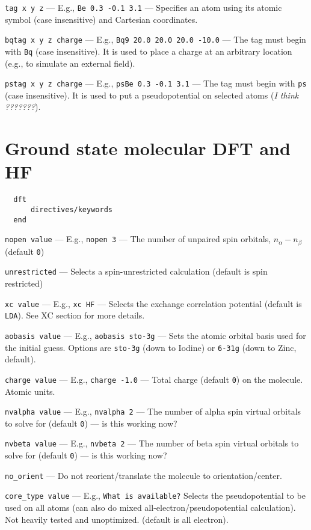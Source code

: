 \documentclass[letterpaper]{book}
\begin{document}
{\tt tag x y z} --- E.g., {\tt Be 0.3 -0.1 3.1} --- Specifies an atom using its atomic symbol (case insensitive) and Cartesian coordinates.

{\tt bqtag x y z charge} --- E.g., {\tt Bq9 20.0 20.0 20.0 -10.0} --- The tag must begin with {\tt Bq} (case insensitive).  It is used to place a charge at an arbitrary location (e.g., to simulate an external field).

{\tt pstag x y z charge} --- E.g., {\tt psBe 0.3 -0.1 3.1} --- The tag must begin with {\tt ps} (case insensitive).  It is used to put a pseudopotential on selected atoms ({\em I think ???????}).


\chapter{Ground state molecular DFT and HF}

\begin{verbatim}
  dft
      directives/keywords
  end
\end{verbatim}

{\tt nopen value} --- E.g., {\tt nopen 3} --- The number of unpaired spin orbitals, $n_\alpha - n_\beta$ (default {\tt 0})

{\tt unrestricted} --- Selects a spin-unrestricted calculation (default is spin restricted)

{\tt xc value} --- E.g., {\tt xc HF} --- Selects the exchange correlation potential (default is {\tt LDA}). See XC section for more details.

{\tt aobasis value} --- E.g., {\tt aobasis sto-3g} --- Sets the atomic orbital basis used for the initial guess.  Options are {\tt sto-3g} (down to Iodine)  or {\tt 6-31g} (down to Zinc, default).  

{\tt charge value} --- E.g., {\tt charge -1.0} --- Total charge (default {\tt 0}) on the molecule. Atomic units.

{\tt nvalpha value} --- E.g., {\tt nvalpha 2} --- The number of alpha spin virtual orbitals to solve for (default {\tt 0}) --- is this working now?

{\tt nvbeta value} --- E.g., {\tt nvbeta 2} --- The number of beta spin virtual orbitals to solve for (default {\tt 0}) --- is this working now?

{\tt no\_orient} --- Do not reorient/translate the molecule to orientation/center.

{\tt core\_type value} --- E.g., {\tt What is available?} Selects the pseudopotential to be used on all atoms (can also do mixed all-electron/pseudopotential calculation).  Not heavily tested and unoptimized. (default is all electron).
\end{document}

